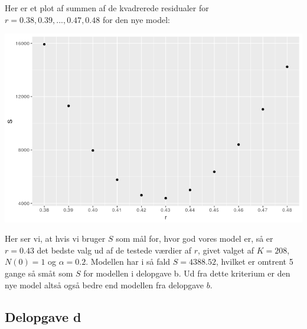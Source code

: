\documentclass[12pt]{article}
\begin{document}
\begin{enumerate}
Her er et plot af summen af de kvadrerede residualer for $r=0.38,0.39,...,0.47,0.48$ for den nye model:
\begin{center}
\includegraphics[scale=0.5]{q2p11.png}
\end{center}
Her ser vi, at hvis vi bruger $S$ som mål for, hvor god vores model er, så er $r=0.43$ det bedste valg ud af de testede værdier af $r$, givet valget af $K=208$, $N(0)=1$ og $\alpha=0.2$. Modellen har i så fald $S=4388.52$, hvilket er omtrent 5 gange så småt som $S$ for modellen i delopgave b. Ud fra dette kriterium er den nye model altså også bedre end modellen fra delopgave $b$.
\end{enumerate}

\subsection{Delopgave d}
\end{document}
